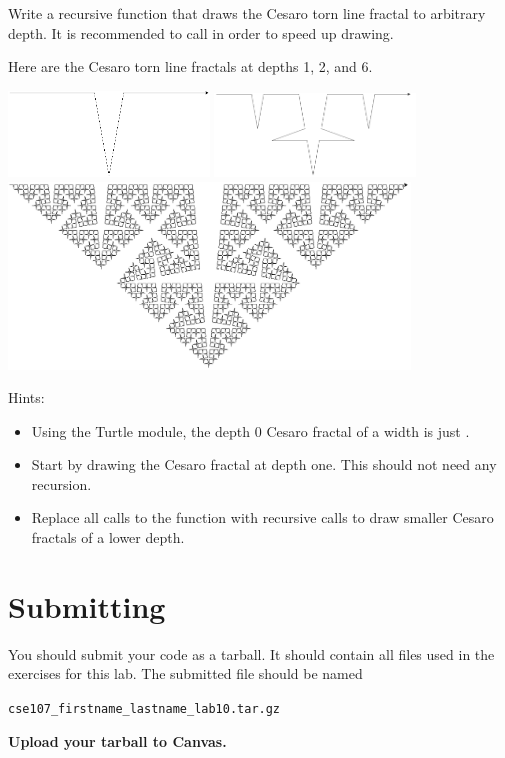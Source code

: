 \documentclass[11pt]{cselabheader}
\begin{document}
\begin{ex}[cesaro.py]
Write a recursive function that draws the Cesaro torn line fractal to
arbitrary depth. It is recommended to call
 in order to speed up drawing.

Here are the Cesaro torn line fractals at depths 1, 2, and 6.
\begin{center}
\includegraphics[width=0.4\textwidth]{img/cesaro1.png}
\includegraphics[width=0.4\textwidth]{img/cesaro2.png}
\includegraphics[width=0.8\textwidth]{img/cesaro6.png}
\end{center}

Hints:
\begin{itemize}
\item Using the Turtle module, the depth 0 Cesaro fractal of a width
 is just .
\item Start by drawing the Cesaro fractal at depth one. This should
not need any recursion.
\item Replace all calls to the  function
with recursive calls to draw smaller Cesaro fractals of a lower depth.
\end{itemize}
\end{ex}

\newpage
\section{Submitting}

You should submit your code as a tarball. It should contain all files
used in the exercises for this lab. The submitted file should be named
\begin{center}
  \texttt{cse107\_firstname\_lastname\_lab10.tar.gz}
\end{center}

\begin{center}
  \textbf{Upload your tarball to Canvas.}
\end{center}

\listofexercises
\end{document}
